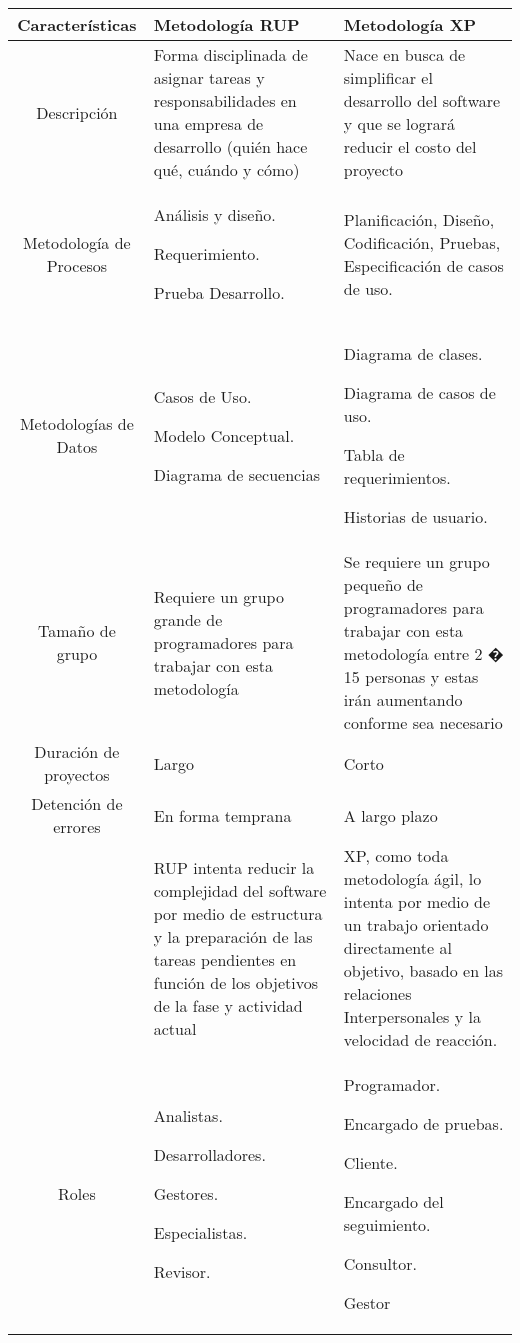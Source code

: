 \documentclass{article}
\begin{document}
\begin{tabular}{|c|p{4cm}|p{4cm}|}
\hline
Caracter\'isticas & Metodolog\'ia RUP & Metodolog\'ia XP\\
\hline
Descripci\'on & Forma disciplinada de asignar tareas y responsabilidades en una empresa de desarrollo (qui\'en hace qu\'e, cu\'ando y c\'omo)& Nace en busca de simplificar el desarrollo del software y que se lograr\'a reducir el costo del proyecto\\
\hline
Metodolog\'ia de Procesos& An\'alisis y dise\~no.

Requerimiento.

Prueba Desarrollo.& Planificaci\'on, Dise\~no, Codificaci\'on, Pruebas, Especificaci\'on de casos de uso.\\
\hline
Metodolog\'ias de Datos & Casos de Uso.

Modelo Conceptual.

Diagrama de secuencias & Diagrama de clases.

Diagrama de casos de uso.

Tabla de requerimientos.

Historias de usuario.\\
\hline
Tama\~no de grupo & Requiere un grupo grande de programadores para trabajar con esta metodolog\'ia & Se requiere un grupo peque\~no de programadores para trabajar con esta metodolog\'ia entre 2 � 15 personas y estas ir\'an aumentando conforme sea necesario \\
\hline
Duraci\'on de proyectos & Largo & Corto\\
\hline
Detenci\'on de errores & En forma temprana & A largo plazo\\  
\hline
&RUP intenta reducir la complejidad del software por medio de estructura y la preparaci\'on de las tareas pendientes en funci\'on de los objetivos de la fase y actividad actual &  XP, como toda metodolog\'ia \'agil, lo intenta por medio de un trabajo orientado directamente al objetivo, basado en las relaciones Interpersonales y la velocidad de reacci\'on.\\
\hline
Roles & Analistas.

Desarrolladores.

Gestores.

Especialistas.

Revisor. & Programador.

Encargado de pruebas.

Cliente.

Encargado del seguimiento.

Consultor.

Gestor\\
\hline

\hline
\end{tabular}
\end{document}
